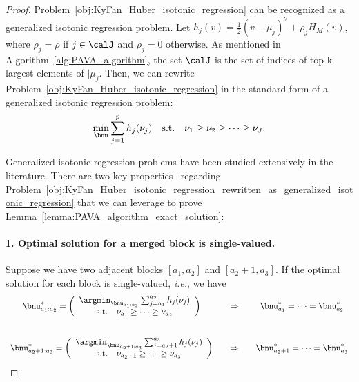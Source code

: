 \begin{proof}

Problem~\eqref{obj:KyFan_Huber_isotonic_regression} can be recognized as a generalized isotonic regression problem.
Let $h_j(v) = \frac{1}{2} (v - \mu_j)^2 + \rho_j H_M(v)$, where $\rho_j = \rho$ if $j \in \calJ$ and $\rho_j = 0$ otherwise.
As mentioned in Algorithm~\ref{alg:PAVA_algorithm}, the set $\calJ$ is the set of indices of top k largest elements of $\vert{\mu_j}$.
Then, we can rewrite Problem~\eqref{obj:KyFan_Huber_isotonic_regression} in the standard form of a generalized isotonic regression problem:
\begin{align}
    \label{obj:KyFan_Huber_isotonic_regression_rewritten_as_generalized_isotonic_regression}
    \min_{\bnu} \sum_{j=1}^{p} h_j(\nu_j) \quad \text{s.t.} \quad \nu_1 \geq \nu_2 \geq \cdots \geq \nu_J.
\end{align}

Generalized isotonic regression problems have been studied extensively in the literature.
There are two key properties~\cite{best2000minimizing,ahuja2001fast} regarding Problem~\eqref{obj:KyFan_Huber_isotonic_regression_rewritten_as_generalized_isotonic_regression} that we can leverage to prove Lemma~\ref{lemma:PAVA_algorithm_exact_solution}:

\paragraph{1. Optimal solution for a merged block is single-valued.}
Suppose we have two adjacent blocks $[a_1, a_2]$ and $[a_2+1, a_3]$.
If the optimal solution for each block is single-valued, \textit{i.e.}, we have
\begin{equation}
\begin{array}{c@{\hspace{2em}}c@{\hspace{2em}}c}
\bnu_{a_1:a_2}^* =  
\left(\begin{array}{c}
\argmin_{\bnu_{a_1:a_2}} \sum_{j=a_1}^{a_2} h_j(\nu_j) \\
\text{s.t.} \quad \nu_{a_1} \geq \cdots \geq \nu_{a_2}
\end{array}\right) & 
\Rightarrow & \bnu_{a_1}^* = \cdots = \bnu_{a_2}^* \\[3em]
\bnu_{a_2+1:a_3}^* =  
\left(\begin{array}{c}
\argmin_{\bnu_{a_2+1:a_3}} \sum_{j=a_2+1}^{a_3} h_j(\nu_j) \\
\text{s.t.} \quad \nu_{a_2+1} \geq \cdots \geq \nu_{a_3}
\end{array}\right) & 
\Rightarrow & \bnu_{a_2+1}^* = \cdots = \bnu_{a_3}^*
\end{array}
\end{equation}


\end{proof}
